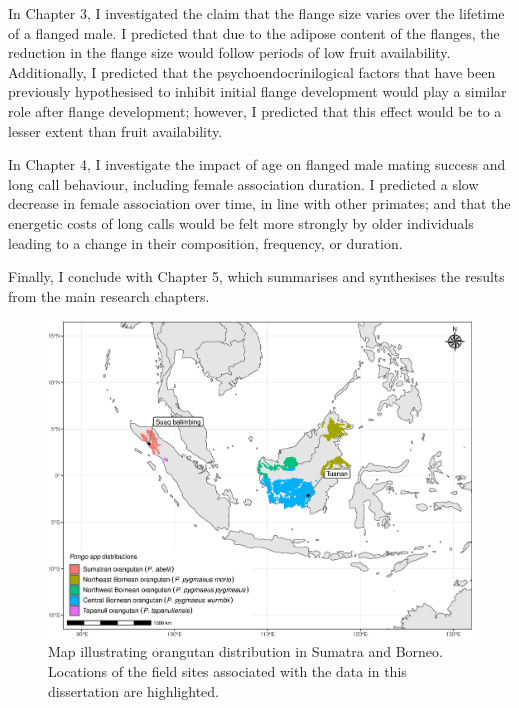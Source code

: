 In Chapter 3, I investigated the claim that the flange size varies over the lifetime of a flanged male. I predicted that due to the adipose content of the flanges, the reduction in the flange size would follow periods of low fruit availability. Additionally, I predicted that the psychoendocrinilogical factors that have been previously hypothesised to inhibit initial flange development would play a similar role after flange development; however, I predicted that this effect would be to a lesser extent than fruit availability. 

In Chapter 4, I investigate the impact of age on flanged male mating success and long call behaviour, including female association duration. I predicted a slow decrease in female association over time, in line with other primates; and that the energetic costs of long calls would be felt more strongly by older individuals leading to a change in their composition, frequency, or duration.

Finally, I conclude with Chapter 5, which summarises and synthesises the results from the main research chapters. 
\begin{figure}[htbp!] 
\centering    
\includegraphics[width=1.0\textwidth]{mawasplot.eps}
\caption{Map illustrating orangutan distribution in Sumatra and Borneo. Locations of the field sites associated with the data in this dissertation are highlighted.}
\label{fig:A map of the distribution of wild Pongo spp. populations across Sumatra and Borneo, with the positions of Suaq Balimbing and Tuanan shown.}
\end{figure}


